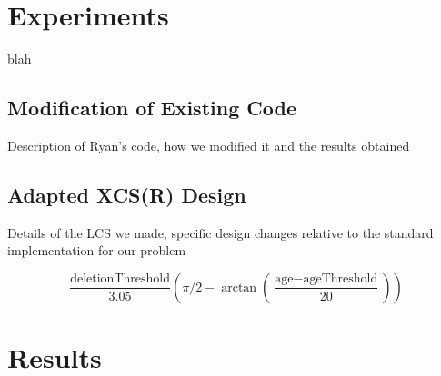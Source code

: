 \documentclass[11pt]{article}
\begin{document}
\begin{multicols}{2}
\section{Experiments}
\label{sec:exp}

blah

\subsection{Modification of Existing Code}
\label{sec:ryan}


Description of Ryan's code, how we modified it and the results obtained





\subsection{Adapted XCS(R) Design}
\label{sec:home}

Details of the LCS we made, specific design changes relative to the standard implementation for our problem


\[
\frac{\textrm{deletionThreshold}}{3.05}
\left(
\pi/2-\arctan\left(\frac{\textrm{age} - \textrm{ageThreshold}}{20} \right) \right)
\]



%
%
%
%
%




\section{Results}



\end{multicols}
\end{document}
